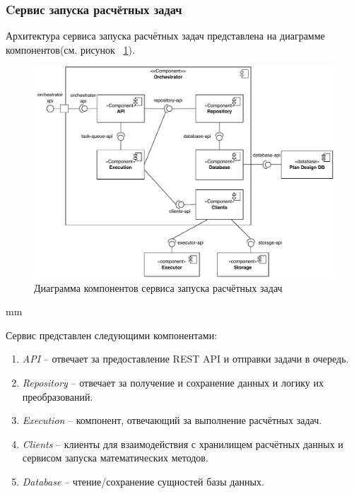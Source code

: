 \subsubsection{{Cервис запуска расчётных задач}}

Архитектура сервиса запуска расчётных задач представлена на диаграмме
компонентов(см. рисунок \ \ref{pic:architecture__orchestrator-component}).

\begin{figure}[H]
	\includegraphics[width=\textwidth]{architecture/pictures/orchestrator/component_common}
	\caption{Диаграмма компонентов сервиса запуска расчётных задач}
	\label{pic:architecture__orchestrator-component}
\end{figure}
 mm

Сервис представлен следующими компонентами:
\begin{enumerate}
	\item {
		\textit{API} -- отвечает за предоставление REST API и отправки задачи в очередь.
	}
	\item {
		\textit{Repository} -- отвечает за получение и сохранение данных и логику их преобразований.
	}
	\item {
		\textit{Execution} -- компонент, отвечающий за выполнение расчётных задач.
	}
	\item {
		\textit{Clients} -- клиенты для взаимодействия с хранилищем расчётных данных
		и сервисом запуска математических методов.
	}
	\item {
		\textit{Database} -- чтение/сохранение сущностей базы данных.
	}
\end{enumerate}

